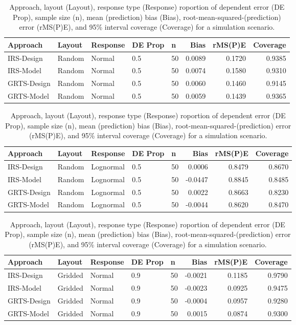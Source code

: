 \documentclass[]{elsarticle} %
\begin{document}
\begin{table}[ht]
\centering
\begin{tabular}{lllllrrr}
  \hline
Approach & Layout & Response & DE Prop & n & Bias & rMS(P)E & Coverage \\ 
  \hline
IRS-Design & Random & Normal & 0.5 & 50 & 0.0089 & 0.1720 & 0.9385 \\ 
  IRS-Model & Random & Normal & 0.5 & 50 & 0.0074 & 0.1580 & 0.9310 \\ 
  GRTS-Design & Random & Normal & 0.5 & 50 & 0.0060 & 0.1460 & 0.9145 \\ 
  GRTS-Model & Random & Normal & 0.5 & 50 & 0.0059 & 0.1439 & 0.9365 \\ 
   \hline
\end{tabular}
\caption{Approach, layout (Layout), response type (Response) roportion of dependent error (DE Prop), sample size (n), mean (prediction) bias (Bias), root-mean-squared-(prediction) error (rMS(P)E), and 95\% interval coverage (Coverage) for a simulation scenario.} 
\end{table}
\begin{table}[ht]
\centering
\begin{tabular}{lllllrrr}
  \hline
Approach & Layout & Response & DE Prop & n & Bias & rMS(P)E & Coverage \\ 
  \hline
IRS-Design & Random & Lognormal & 0.5 & 50 & 0.0006 & 0.8479 & 0.8670 \\ 
  IRS-Model & Random & Lognormal & 0.5 & 50 & -0.0447 & 0.8845 & 0.8485 \\ 
  GRTS-Design & Random & Lognormal & 0.5 & 50 & 0.0022 & 0.8663 & 0.8230 \\ 
  GRTS-Model & Random & Lognormal & 0.5 & 50 & -0.0044 & 0.8620 & 0.8470 \\ 
   \hline
\end{tabular}
\caption{Approach, layout (Layout), response type (Response) roportion of dependent error (DE Prop), sample size (n), mean (prediction) bias (Bias), root-mean-squared-(prediction) error (rMS(P)E), and 95\% interval coverage (Coverage) for a simulation scenario.} 
\end{table}
\begin{table}[ht]
\centering
\begin{tabular}{lllllrrr}
  \hline
Approach & Layout & Response & DE Prop & n & Bias & rMS(P)E & Coverage \\ 
  \hline
IRS-Design & Gridded & Normal & 0.9 & 50 & -0.0021 & 0.1185 & 0.9790 \\ 
  IRS-Model & Gridded & Normal & 0.9 & 50 & -0.0023 & 0.0925 & 0.9475 \\ 
  GRTS-Design & Gridded & Normal & 0.9 & 50 & -0.0004 & 0.0957 & 0.9280 \\ 
  GRTS-Model & Gridded & Normal & 0.9 & 50 & 0.0015 & 0.0874 & 0.9300 \\ 
   \hline
\end{tabular}
\caption{Approach, layout (Layout), response type (Response) roportion of dependent error (DE Prop), sample size (n), mean (prediction) bias (Bias), root-mean-squared-(prediction) error (rMS(P)E), and 95\% interval coverage (Coverage) for a simulation scenario.} 
\end{table}
\end{document}
